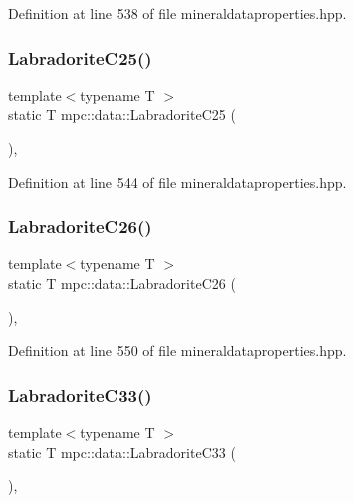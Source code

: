 Definition at line 538 of file mineraldataproperties.\+hpp.

\mbox{\label{namespacempc_1_1data_aca7a0a80d87a253995479187df2a1775}} 
\subsubsection{\texorpdfstring{Labradorite\+C25()}{LabradoriteC25()}}
{\footnotesize\ttfamily template$<$typename T $>$ \\
static T mpc\+::data\+::\+Labradorite\+C25 (\begin{DoxyParamCaption}{ }\end{DoxyParamCaption})\hspace{0.3cm}{\ttfamily [inline]}, {\ttfamily [static]}}



Definition at line 544 of file mineraldataproperties.\+hpp.

\mbox{\label{namespacempc_1_1data_a3b111f6de51ef868b7bd6bcb2a65f891}} 
\subsubsection{\texorpdfstring{Labradorite\+C26()}{LabradoriteC26()}}
{\footnotesize\ttfamily template$<$typename T $>$ \\
static T mpc\+::data\+::\+Labradorite\+C26 (\begin{DoxyParamCaption}{ }\end{DoxyParamCaption})\hspace{0.3cm}{\ttfamily [inline]}, {\ttfamily [static]}}



Definition at line 550 of file mineraldataproperties.\+hpp.

\mbox{\label{namespacempc_1_1data_a441b677f9400c94cc1e402c199776576}} 
\subsubsection{\texorpdfstring{Labradorite\+C33()}{LabradoriteC33()}}
{\footnotesize\ttfamily template$<$typename T $>$ \\
static T mpc\+::data\+::\+Labradorite\+C33 (\begin{DoxyParamCaption}{ }\end{DoxyParamCaption})\hspace{0.3cm}{\ttfamily [inline]}, {\ttfamily [static]}}



